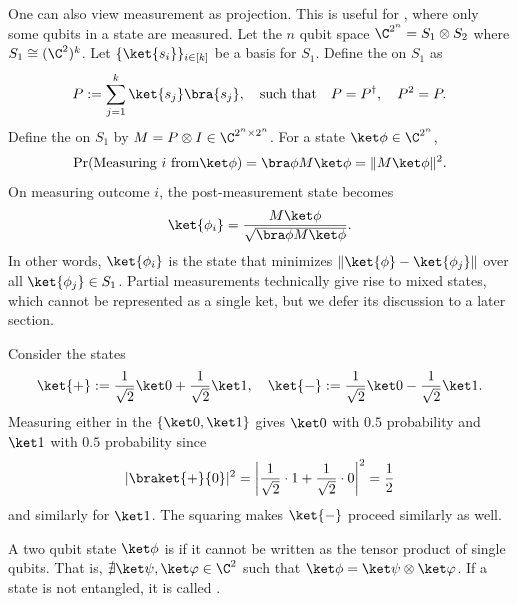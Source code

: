 \begin{definition}
One can also view measurement as projection. This is useful for , where only some qubits in a state are measured. Let the $n$ qubit space $\C^{2^n} = S_1 \otimes S_2$ where $S_1 \cong (\C^2)^k$. Let $\{\ket{s_i}\}_{i \in [k]}$ be a basis for $S_1$. Define the  on $S_1$ as
\begin{align}
    P := \sum_{j=1}^k \ket{s_j} \bra{s_j}, \quad 
    \text{such that} \quad
    P = P^\dagger, \quad
    P^2 = P.
\end{align}
Define the  on $S_1$ by $M = P \otimes I \in \C^{2^n \times 2^n}$. For a state $\ket\phi \in \C^{2^n}$, 
\begin{align}
    \Pr(\text{Measuring }i\text{ from}\ket\phi)
    = \bra\phi M \ket\phi 
    = \| M \ket\phi \|^2.
\end{align}
On measuring outcome $i$, the post-measurement state becomes
\begin{align}
    \ket{\phi_i}
    = \frac{M \ket\phi}{\sqrt{\bra\phi M \ket\phi}}.
\end{align}
In other words, $\ket{\phi_i}$ is the state that minimizes $\|\ket{\phi} - \ket{\phi_{j}}\|$ over all $\ket{\phi_j} \in S_1$. Partial measurements technically give rise to mixed states, which cannot be represented as a single ket, but we defer its discussion to a later section.
\end{definition}

\begin{example}
Consider the states
\begin{align}
    \ket{+} := \frac{1}{\sqrt2}\ket0 + \frac{1}{\sqrt2}\ket1, \quad
    \ket{-} := \frac{1}{\sqrt2}\ket0 - \frac{1}{\sqrt2}\ket1.
\end{align}
Measuring either in the  $\{\ket0, \ket1\}$ gives $\ket0$ with $0.5$ probability and $\ket1$ with $0.5$ probability since
\begin{align*}
    |\braket{+}{0}|^2 
    = \left| \frac{1}{\sqrt2} \cdot 1 + \frac{1}{\sqrt2} \cdot 0 \right|^2
    = \frac{1}{2}
\end{align*}
and similarly for $\ket1$. The squaring makes $\ket{-}$ proceed similarly as well.
\end{example}

\begin{definition}
A two qubit state $\ket\phi$ is  if it cannot be written as the tensor product of single qubits. That is, $\nexists \ket\psi, \ket\varphi \in \C^2$ such that $\ket\phi = \ket\psi \otimes \ket\varphi$. If a state is not entangled, it is called .
\end{definition}

